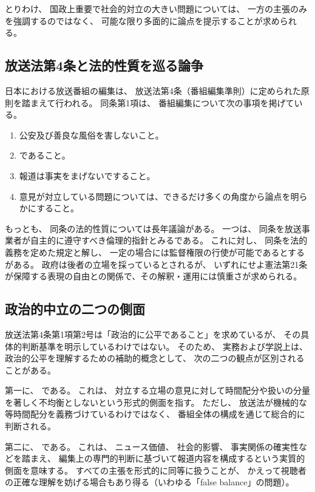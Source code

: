 とりわけ、
国政上重要で社会的対立の大きい問題については、
一方の主張のみを強調するのではなく、
可能な限り多面的に論点を提示することが求められる。

\subsection{放送法第4条と法的性質を巡る論争}

日本における放送番組の編集は、
放送法第4条（番組編集準則）に定められた原則を踏まえて行われる。
同条第1項は、
番組編集について次の事項を掲げている。

\begin{enumerate}
    \item 公安及び善良な風俗を害しないこと。
    \item {}であること。
    \item 報道は事実をまげないですること。
    \item 意見が対立している問題については、できるだけ多くの角度から論点を明らかにすること。
\end{enumerate}

もっとも、
同条の法的性質については長年議論がある。
一つは、
同条を放送事業者が自主的に遵守すべき倫理的指針とみるである。
これに対し、
同条を法的義務を定めた規定と解し、
一定の場合には監督権限の行使が可能であるとするがある。
政府は後者の立場を採っているとされるが、
いずれにせよ憲法第21条が保障する表現の自由との関係で、その解釈・運用には慎重さが求められる。

\subsection{政治的中立の二つの側面}
放送法第4条第1項第2号は「政治的に公平であること」を求めているが、
その具体的判断基準を明示しているわけではない。
そのため、
実務および学説上は、
政治的公平を理解するための補助的概念として、
次の二つの観点が区別されることがある。

第一に、
である。
これは、
対立する立場の意見に対して時間配分や扱いの分量を著しく不均衡としないという形式的側面を指す。
ただし、
放送法が機械的な等時間配分を義務づけているわけではなく、
番組全体の構成を通じて総合的に判断される。

第二に、
である。
これは、
ニュース価値、
社会的影響、
事実関係の確実性などを踏まえ、
編集上の専門的判断に基づいて報道内容を構成するという実質的側面を意味する。
すべての主張を形式的に同等に扱うことが、
かえって視聴者の正確な理解を妨げる場合もあり得る（いわゆる「false balance」の問題）。

